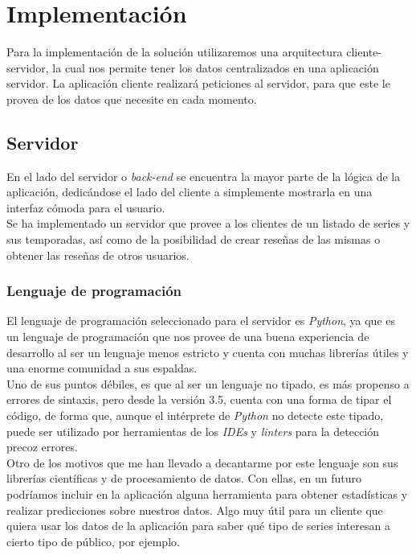 \chapter{Implementación}

Para la implementación de la solución utilizaremos una arquitectura cliente-servidor\cite{client-server}, la cual nos
permite tener los datos centralizados en una aplicación servidor. La aplicación cliente realizará peticiones al
servidor, para que este le provea de los datos que necesite en cada momento.\\

\section{Servidor}
En el lado del servidor o \textit{back-end} se encuentra la mayor parte de la lógica de la aplicación, dedicándose el
lado del cliente a simplemente mostrarla en una interfaz cómoda para el usuario.\\

Se ha implementado un servidor que provee a los clientes de un listado de series y sus temporadas, así como de la
posibilidad de crear reseñas de las mismas o obtener las reseñas de otros usuarios.

\subsection{Lenguaje de programación}
El lenguaje de programación seleccionado para el servidor es \textit{Python}\cite{python}, ya que es un lenguaje de
programación que nos provee de una buena experiencia de desarrollo al ser un lenguaje menos estricto y cuenta con muchas
librerías útiles y una enorme comunidad a sus espaldas.\\

Uno de sus puntos débiles, es que al ser un lenguaje no tipado, es más propenso a errores de sintaxis, pero desde la
versión 3.5, cuenta con una forma de tipar el código, de forma que, aunque el intérprete de \textit{Python} no detecte
este tipado, puede ser utilizado por herramientas de los \textit{IDEs} y \textit{linters} para la detección precoz
errores.\\

Otro de los motivos que me han llevado a decantarme por este lenguaje son sus librerías científicas y de procesamiento
de datos. Con ellas, en un futuro podríamos incluir en la aplicación alguna herramienta para obtener estadísticas y
realizar predicciones sobre nuestros datos. Algo muy útil para un cliente que quiera usar los datos de la aplicación
para saber qué tipo de series interesan a cierto tipo de público, por ejemplo.\\

